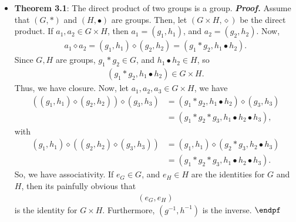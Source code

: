 \documentclass{report}
\begin{document}
\begin{itemize}
            \begin{align*}
                (g_{1}, h_{1}) \diamond (g_{2}h_{2}) = (g_{1} \ast g_{2}, h_{1} \bullet h_{2})
            \end{align*}
            for all $g_{i} \in G$, $h_{i} \in H$. Under this operation, we call $G\times H$ the \textbf{direct product} of $G$ and $H$.
            \bigbreak \noindent 
            \textbf{Note:} So, the underlying set is the Cartesian product, with operation $\diamond$. Thus, the group is
            \begin{align*}
                (G\times H, \diamond)
            .\end{align*}
        \item \textbf{Theorem 3.1}: The direct product of two groups is a group.
            \bigbreak \noindent 
            \textbf{\textit{Proof.}} Assume that $(G, \ast)$ and $(H, \bullet)$ are groups. Then, let $(G\times H, \diamond)$ be the direct product. 
            \bigbreak \noindent 
            If $a_{1}, a_{2} \in G\times H$, then $a_{1} = (g_{1}, h_{1})$, and $a_{2} = (g_{2}, h_{2})$. Now, 
            \begin{align*}
                a_{1} \diamond a_{2} = (g_{1}, h_{1}) \diamond (g_{2}, h_{2}) = (g_{1} \ast g_{2}, h_{1} \bullet h_{2})
            .\end{align*}
            Since $G,H$ are groups, $g_{1} \ast g_{2} \in G$, and $h_{1} \bullet h_{2} \in H$, so
            \begin{align*}
                (g_{1} \ast g_{2}, h_{1} \bullet h_{2}) \in G \times H
            .\end{align*}
            Thus, we have closure. Now, let $a_{1}, a_{2}, a_{3} \in G\times H $, we have
            \begin{align*}
                ((g_{1}, h_{1}) \diamond (g_{2}, h_{2})) \diamond (g_{3}, h_{3}) &= (g_{1} \ast g_{2}, h_{1} \bullet h_{2}) \diamond (g_{3}, h_{3}) \\
                                                                                 &= (g_{1} \ast g_{2} \ast g_{3}, h_{1} \bullet h_{2} \bullet h_{3})
            ,\end{align*}
            with
            \begin{align*}
                (g_{1}, h_{1}) \diamond ((g_{2}, h_{2}) \diamond (g_{3}, h_{3})) &= (g_{1}, h_{1}) \diamond (g_{2} \ast g_{3}, h_{2} \bullet h_{3}) \\
                                                                                 &= (g_{1} \ast g_{2} \ast g_{3}, h_{1} \bullet h_{2} \bullet h_{3})
            .\end{align*}
            So, we have associativity. If $e_{G} \in G$, and $e_{H} \in H$ are the identities for $G$ and $H$, then its painfully obvious that
            \begin{align*}
                (e_{G}, e_{H})
            \end{align*}
            is the identity for $G \times H$. Furthermore, $(g^{-1}, h^{-1})$ is the inverse. $\endpf$

    \end{itemize}
\end{document}
